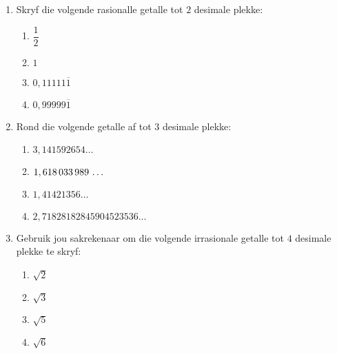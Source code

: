 \begin{eocexercises}{}
\begin{enumerate}[itemsep=5pt, label=\textbf{\arabic*}. ]


\item Skryf die volgende rasionalle getalle tot $2$ desimale plekke:
    \begin{enumerate}[itemsep=5pt, label=\textbf{\alph*}. ] 
    \item $\dfrac{1}{2}$
    \item $1$
    \item $0,11111\overline{1}$
    \item $0,99999\overline{1}$
    \end{enumerate}

\item Rond die volgende getalle af tot $3$ desimale plekke:
\begin{multicols}{2}
    \begin{enumerate}[itemsep=5pt, label=\textbf{\alph*}. ] 
    \item $3,141592654\ldots$
    \item $1,618\phantom{\rule{0.166667em}{0ex}}033\phantom{\rule{0.166667em}{0ex}}989\phantom{\rule{0.166667em}{0ex}}\ldots$
    \item $1,41421356\ldots$
    \item $2,71828182845904523536\ldots$
    \end{enumerate}
\end{multicols}
\item Gebruik jou sakrekenaar om die volgende irrasionale getalle tot $4$ desimale plekke te skryf:
\begin{multicols}{2}
    \begin{enumerate}[itemsep=5pt, label=\textbf{\alph*}. ] 
    \item $\sqrt{2}$
    \item $\sqrt{3}$
    \item $\sqrt{5}$
    \item $\sqrt{6}$
    \end{enumerate}
\end{multicols}


\end{enumerate}
\end{eocexercises}
